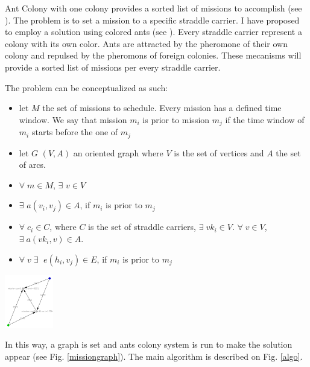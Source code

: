 \documentclass[a4paper,10pt]{article}
\makeatletter
\newenvironment{figurehere}
{\def\@captype{figure}}
{}
\makeatother
\begin{document}
\begin{multicols}{2}
		Ant Colony with one colony provides a sorted list of missions to accomplish (see \cite{Montemanni04,Bullnheimer97,Bullnheimer99}). The problem is to set a mission to a specific straddle carrier.
		I have proposed to employ a solution using colored ants (see \cite{Bertelle02}). Every straddle carrier represent a colony with its own color. Ants are attracted by the pheromone of their own colony and repulsed by the pheromons of foreign colonies. These mecanisms will provide a sorted list of missions per every straddle carrier.
	
		The problem can be conceptualized as such: 
		\begin{itemize}
	 		\item let $M$ the set of missions to schedule. Every mission has a defined time window. We say that mission $m_i$ is prior to mission $m_j$ if the time window of $m_i$ starts before the one of $m_j$
			\item let $G$ $(V,A)$ an oriented graph where $V$ is the set of vertices and $A$ the set of arcs.
			\item $\forall \; m \in M$, $\exists$ $v \in V$
			\item $\exists$ $a(v_i , v_j) \in A$, if $m_i$ is prior to $m_j$
			\item $\forall \; c_i \in C$, where $C$ is the set of straddle carriers, $\exists \; vk_i \in V$. $\forall \; v \in V$, $\exists \; a(vk_i,v) \in A$.
			\item $\forall \; v \; \exists \;$ $e(h_i , v_j) \in E$, if $m_i$ is prior to $m_j$	
		\end{itemize}
		\begin{figurehere}
			\begin{center}
 				\includegraphics[width=80px]{Shemas/missiongraph.png} \\
				\caption{Mission graph for 2 straddle carriers and 2 missions }
				\label{missiongraph}
			\end{center}
		\end{figurehere}
		In this way, a graph is set and ants colony system is run to make the solution appear (see Fig. \ref{missiongraph}). The main algorithm is described on Fig. \ref{algo}. \\
		

\end{multicols}
\end{document}
